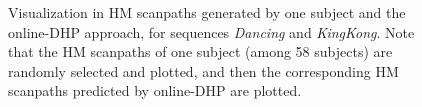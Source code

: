 \documentclass[10pt,journal,compsoc]{IEEEtran}
\begin{document}
\begin{figure}
\vspace{-1em}
	\begin{center}
		\centerline{}%
\vspace{-1em}
        \centerline{}%
\vspace{-1em}
                   \caption{\footnotesize{Visualization in HM scanpaths generated by one subject and the online-DHP approach, for sequences \textit{Dancing} and \textit{KingKong}. Note that the HM scanpaths of one subject (among 58 subjects) are randomly selected and plotted, and then the corresponding HM scanpaths predicted by online-DHP are plotted.}}
		\label{scan-path-example}
	\end{center}
\vspace{-2em}
\end{figure}
\end{document}
